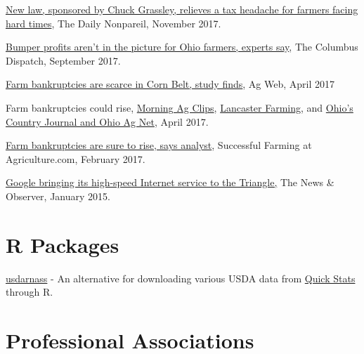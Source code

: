 \documentclass[letterpaper]{article}
\renewenvironment{itemize}{
  \begin{list}{}{
    \setlength{\leftmargin}{1.5em}
  }
}{
  \end{list}
}
\begin{document}
\begin{itemize}
\item \href{http://www.nonpareilonline.com/news/politics/national_government/new-law-sponsored-by-chuck-grassley-relieves-a-tax-headache/article_c13b6ee6-d38c-11e7-a679-aff36c8016b4.html}{New law, sponsored by Chuck Grassley, relieves a tax headache for farmers facing hard times}, The Daily Nonpareil, November 2017.
\item \href{http://www.dispatch.com/news/20170921/bumper-profits-arent-in-picture-for-ohio-farmers-experts-say}{Bumper profits aren't in the picture for Ohio farmers, experts say}, The Columbus Dispatch, September 2017.
\item \href{https://www.agweb.com/article/farm-bankruptcies-are-scarce-in-corn-belt-study-finds-naa-nate-birt/}{Farm bankruptcies are scarce in Corn Belt, study finds}, Ag Web, April 2017
\item Farm bankruptcies could rise, \href{https://www.morningagclips.com/farm-bankruptcies-could-rise/}{Morning Ag Clips}, \href{http://www.lancasterfarming.com/market_news/finances/farm-bankruptcies-could-rise/article_21bbfc3f-9e2a-5e25-a737-36a84f140178.html}{Lancaster Farming}, and \href{http://ocj.com/2017/04/farm-bankruptcies-could-rise/}{Ohio's Country Journal and Ohio Ag Net}, April 2017.
\item \href{https://www.agriculture.com/news/business/farm-bankruptcy-rates-are-sure-to-rise-says-analyst}{Farm bankruptcies are sure to rise, says analyst}, Successful Farming at Agriculture.com, February 2017.
\item \href{http://www.newsobserver.com/news/local/community/cary-news/article10235465.html}{Google bringing its high-speed Internet service to the Triangle,} The News \& Observer, January 2015.
\end{itemize}



\section*{R Packages}

\begin{itemize}
\item \href{https://cran.r-project.org/web/packages/usdarnass/}{usdarnass} - An alternative for downloading various USDA data from \href{https://quickstats.nass.usda.gov/}{Quick Stats} through R.
\end{itemize}


\section*{Professional Associations}
\end{document}
